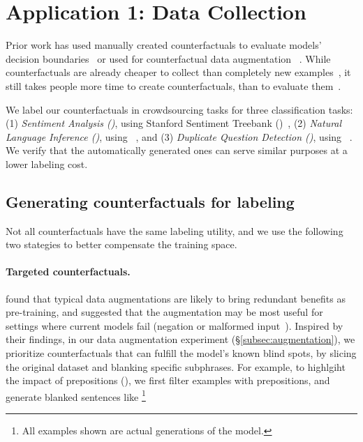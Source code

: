 \section{Application 1: Data Collection}
\label{sec:app_label}

Prior work has used manually created counterfactuals to evaluate models' decision boundaries~\cite{gardner2020contrast} or used for counterfactual data augmentation~\cite{kaushik2019learning} .
While counterfactuals are already cheaper to collect than completely new examples~\cite{Khashabi2020MoreBF}, it still takes people more time to create counterfactuals, than to evaluate them~\cite{ribeiro2018sear}. 

We label our counterfactuals in crowdsourcing tasks for three classification tasks: 
(1) \emph{Sentiment Analysis (\sst)}, using Stanford Sentiment Treebank (\dsst)~\cite{socher2013recursive},
(2) \emph{Natural Language Inference (\nli)}, using \dnli~\cite{bowman-etal-2015-large}, and 
(3) \emph{Duplicate Question Detection (\qqp)}, using \dqqp~\cite{wang2018glue}.
We verify that the automatically generated ones can serve similar purposes at a lower labeling cost.


\subsection{Generating counterfactuals for labeling}
\label{subsec:gen_counterfactual_for_labeling}
Not all counterfactuals have the same labeling utility, and we use the following two stategies to better compensate the training space.


\paragraph{Targeted counterfactuals.}
\citet{longpre2020effective} found that typical data augmentations are likely to bring redundant benefits as pre-training, and suggested that the augmentation may be most useful for settings where current models fail (\eg negation or malformed input~\cite{rogers2020primer,ettinger2020bert}).
Inspired by their findings, in our data augmentation experiment (\S\ref{subsec:augmentation}), we prioritize counterfactuals that can fulfill the model's known blind spots, by slicing the original dataset and blanking specific subphrases.  
For example, to highlgiht the impact of prepositions (\eg {}), we first filter examples with prepositions, and generate blanked sentences like 
\footnote{All examples shown are actual generations of the model. }

